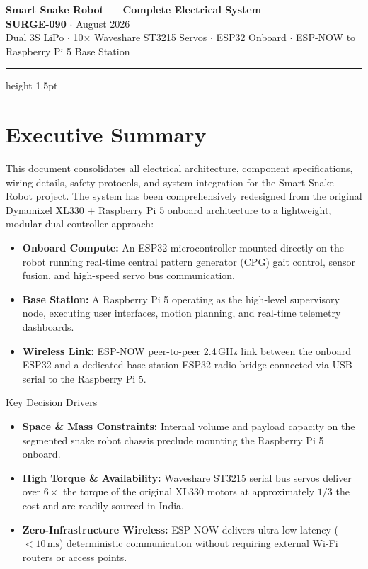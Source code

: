 \documentclass[11pt,a4paper]{article}
\begin{document}
\begin{center}
    {\LARGE \textbf{\color{primary} Smart Snake Robot --- Complete Electrical System}}\\[0.4em]
    {\large \textbf{SURGE-090} $\cdot$ August 2026}\\[0.3em]
    {\normalsize \color{darkgray} Dual 3S LiPo $\cdot$ 10$\times$ Waveshare ST3215 Servos $\cdot$ ESP32 Onboard $\cdot$ ESP-NOW to Raspberry Pi 5 Base Station}
\end{center}

\vspace{0.8em}
\hrule height 1.5pt
\vspace{1.2em}

\section*{Executive Summary}
This document consolidates all electrical architecture, component specifications, wiring details, safety protocols, and system integration for the Smart Snake Robot project. The system has been comprehensively redesigned from the original Dynamixel XL330 + Raspberry Pi 5 onboard architecture to a lightweight, modular dual-controller approach:
\begin{itemize}[leftmargin=1.5em, itemsep=0.2em]
    \item \textbf{Onboard Compute:} An ESP32 microcontroller mounted directly on the robot running real-time central pattern generator (CPG) gait control, sensor fusion, and high-speed servo bus communication.
    \item \textbf{Base Station:} A Raspberry Pi 5 operating as the high-level supervisory node, executing user interfaces, motion planning, and real-time telemetry dashboards.
    \item \textbf{Wireless Link:} ESP-NOW peer-to-peer 2.4\,GHz link between the onboard ESP32 and a dedicated base station ESP32 radio bridge connected via USB serial to the Raspberry Pi 5.
\end{itemize}

\begin{infobox}{Key Decision Drivers}
\begin{itemize}[leftmargin=1.2em, itemsep=0.2em]
    \item \textbf{Space \& Mass Constraints:} Internal volume and payload capacity on the segmented snake robot chassis preclude mounting the Raspberry Pi 5 onboard.
    \item \textbf{High Torque \& Availability:} Waveshare ST3215 serial bus servos deliver over $6\times$ the torque of the original XL330 motors at approximately $1/3$ the cost and are readily sourced in India.
    \item \textbf{Zero-Infrastructure Wireless:} ESP-NOW delivers ultra-low-latency ($<10\,\text{ms}$) deterministic communication without requiring external Wi-Fi routers or access points.
\end{itemize}
\end{infobox}
\end{document}
